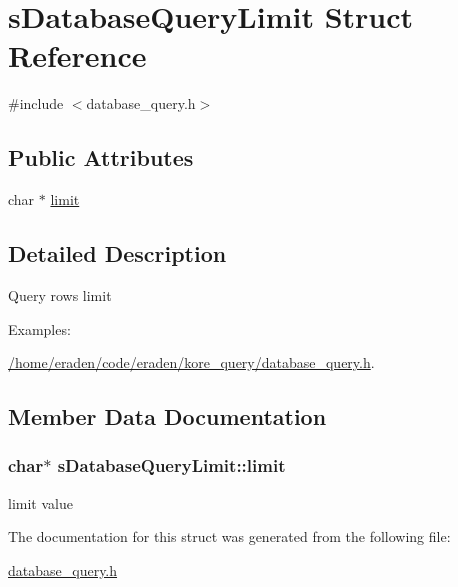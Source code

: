 \hypertarget{structsDatabaseQueryLimit}{}\section{s\+Database\+Query\+Limit Struct Reference}
\label{structsDatabaseQueryLimit}


{\ttfamily \#include $<$database\+\_\+query.\+h$>$}

\subsection*{Public Attributes}
\begin{DoxyCompactItemize}
\item 
char $\ast$ \hyperlink{structsDatabaseQueryLimit_a5b4d5190d79ffb220342d502d7a3a480}{limit}
\end{DoxyCompactItemize}


\subsection{Detailed Description}
Query rows limit \begin{Desc}
\item[Examples\+: ]\par
\hyperlink{_2home_2eraden_2code_2eraden_2kore_query_2database_query_8h-example}{/home/eraden/code/eraden/kore\+\_\+query/database\+\_\+query.\+h}.\end{Desc}


\subsection{Member Data Documentation}
\subsubsection[{\texorpdfstring{limit}{limit}}]{\setlength{\rightskip}{0pt plus 5cm}char$\ast$ s\+Database\+Query\+Limit\+::limit}\hypertarget{structsDatabaseQueryLimit_a5b4d5190d79ffb220342d502d7a3a480}{}\label{structsDatabaseQueryLimit_a5b4d5190d79ffb220342d502d7a3a480}
limit value 

The documentation for this struct was generated from the following file\+:\begin{DoxyCompactItemize}
\item 
\hyperlink{database__query_8h}{database\+\_\+query.\+h}\end{DoxyCompactItemize}
